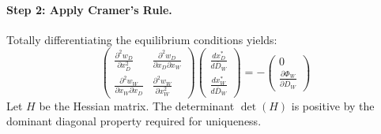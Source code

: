 \documentclass[12pt]{article}
\begin{document}
\paragraph{Step 2: Apply Cramer's Rule.}
Totally differentiating the equilibrium conditions yields:
\begin{equation*}
\begin{pmatrix} 
\frac{\partial^{2}w_{D}}{\partial x_{D}^{2}} & \frac{\partial^{2}w_{D}}{\partial x_{D}\partial x_{W}} \\ 
\frac{\partial^{2}w_{W}}{\partial x_{W}\partial x_{D}} & \frac{\partial^{2}w_{W}}{\partial x_{W}^{2}} 
\end{pmatrix} 
\begin{pmatrix} 
\frac{dx_{D}^{*}}{d\overline{D}_{W}} \\ 
\frac{dx_{W}^{*}}{d\overline{D}_{W}} 
\end{pmatrix} = -\begin{pmatrix} 
0 \\ 
\frac{\partial\Phi_{W}}{\partial\overline{D}_{W}} 
\end{pmatrix}
\end{equation*}
Let $H$ be the Hessian matrix. The determinant $\det(H)$ is positive by the dominant diagonal property required for uniqueness.
\end{document}
